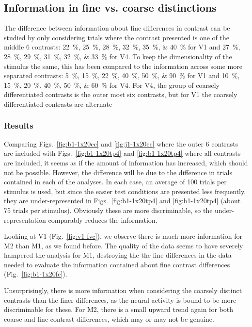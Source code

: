 \subsection{Information in fine vs. coarse distinctions}

The difference between information about fine differences in contrast can be studied by only considering trials where the contrast presented is one of the middle 6 contrasts:
\SIlist{22;25;28;32;35;40}{\percent} for \ac{V1} and
\SIlist{27;28;29;31;32;33}{\percent} for \ac{V4}.
To keep the dimensionality of the stimulus the same, this has been compared to the information across some more separated contrasts:
\SIlist{5;15;22;40;50;90}{\percent} for \ac{V1} and
\SIlist{10;15;20;40;50;60}{\percent} for \ac{V4}.
For \ac{V4}, the group of coarsely differentiated contrasts is the outer most six contrasts, but for \ac{V1} the coarsely differentiated contrasts are alternate


\subsubsection{Results}

Comparing Figs.~\ref{fig:b1-1x20cc} and \ref{fig:j1-1x20cc} where the outer 6 contrasts are included with Figs.~\ref{fig:b1-1x20tp4} and \ref{fig:b1-1x20tp4} where all contrasts are included, it seems as if the amount of information has increased, which should not be possible.
However, the difference will be due to the difference in trials contained in each of the analyses.
In each case, an average of 100 trials per stimulus is used, but since the easier test conditions are presented less frequently, they are under-represented in Figs.~\ref{fig:b1-1x20tp4} and \ref{fig:b1-1x20tp4} (about 75 trials per stimulus).
Obviously these are more discriminable, so the under-representation comparably reduces the information.

Looking at \ac{V1} (Fig.~\ref{fig:v1-fvc}), we observe there is much more information for \ac{M2} than \ac{M1}, as we found before.
The quality of the data seems to have severely hampered the analysis for \ac{M1}, destroying the the fine differences in the data needed to evaluate the information contained about fine contrast differences (Fig.~\ref{fig:b1-1x20fc}).

Unsurprisingly, there is more information when considering the coarsely distinct contrasts than the finer differences, as the neural activity is bound to be more discriminable for these.
For \ac{M2}, there is a small upward trend again for both coarse and fine contrast differences, which may or may not be genuine.

